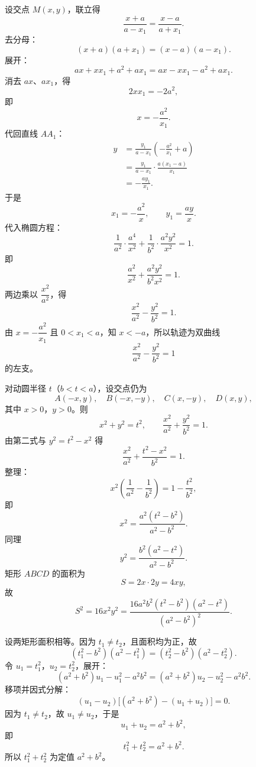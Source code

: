 \begin{answer}
设交点 $M(x,y)$，联立得
\nopagebreak[4]
\[\frac{x+a}{a-x_1}=\frac{x-a}{a+x_1}.\]
去分母：
\nopagebreak[4]
\[(x+a)(a+x_1)=(x-a)(a-x_1).\]
展开：
\nopagebreak[4]
\[ax+xx_1+a^2+ax_1=ax-xx_1-a^2+ax_1.\]
消去 $ax$、$ax_1$，得
\nopagebreak[4]
\[2xx_1=-2a^2,\]
即
\nopagebreak[4]
\[x=-\frac{a^2}{x_1}.\]
代回直线 $AA_1$：
\nopagebreak[4]
\[\begin{aligned}
y&=\frac{y_1}{a-x_1}\left(-\frac{a^2}{x_1}+a\right)\\
&=\frac{y_1}{a-x_1}\cdot\frac{a(x_1-a)}{x_1}\\
&=-\frac{ay_1}{x_1}.
\end{aligned}\]
于是
\nopagebreak[4]
\[x_1=-\frac{a^2}{x},\qquad y_1=\frac{ay}{x}.\]
代入椭圆方程：
\nopagebreak[4]
\[\frac{1}{a^2}\cdot\frac{a^4}{x^2}
+\frac{1}{b^2}\cdot\frac{a^2y^2}{x^2}=1.\]
即
\nopagebreak[4]
\[\frac{a^2}{x^2}+\frac{a^2y^2}{b^2x^2}=1.\]
两边乘以 $\dfrac{x^2}{a^2}$，得
\nopagebreak[4]
\[\frac{x^2}{a^2}-\frac{y^2}{b^2}=1.\]
由 $x=-\dfrac{a^2}{x_1}$ 且 $0<x_1<a$，知 $x<-a$，所以轨迹为双曲线
\nopagebreak[4]
\[\frac{x^2}{a^2}-\frac{y^2}{b^2}=1\]
的左支。


对动圆半径 $t$（$b<t<a$），设交点仍为
\nopagebreak[4]
\[A(-x,y),\quad B(-x,-y),\quad C(x,-y),\quad D(x,y),\]
其中 $x>0$，$y>0$。则
\nopagebreak[4]
\[x^2+y^2=t^2,\qquad \frac{x^2}{a^2}+\frac{y^2}{b^2}=1.\]
由第二式与 $y^2=t^2-x^2$ 得
\nopagebreak[4]
\[\frac{x^2}{a^2}+\frac{t^2-x^2}{b^2}=1.\]
整理：
\nopagebreak[4]
\[x^2\left(\frac1{a^2}-\frac1{b^2}\right)=1-\frac{t^2}{b^2},\]
即
\nopagebreak[4]
\[x^2=\frac{a^2(t^2-b^2)}{a^2-b^2}.\]
同理
\nopagebreak[4]
\[y^2=\frac{b^2(a^2-t^2)}{a^2-b^2}.\]
矩形 $ABCD$ 的面积为
\nopagebreak[4]
\[S=2x\cdot2y=4xy,\]
故
\nopagebreak[4]
\[S^2=16x^2y^2
=\frac{16a^2b^2(t^2-b^2)(a^2-t^2)}{(a^2-b^2)^2}.\]

设两矩形面积相等。因为 $t_1\neq t_2$，且面积均为正，故
\nopagebreak[4]
\[(t_1^2-b^2)(a^2-t_1^2)
=(t_2^2-b^2)(a^2-t_2^2).\]
令 $u_1=t_1^2$，$u_2=t_2^2$，展开：
\nopagebreak[4]
\[(a^2+b^2)u_1-u_1^2-a^2b^2
=(a^2+b^2)u_2-u_2^2-a^2b^2.\]
移项并因式分解：
\nopagebreak[4]
\[(u_1-u_2)\bigl[(a^2+b^2)-(u_1+u_2)\bigr]=0.\]
因为 $t_1\neq t_2$，故 $u_1\neq u_2$，于是
\nopagebreak[4]
\[u_1+u_2=a^2+b^2,\]
即
\nopagebreak[4]
\[t_1^2+t_2^2=a^2+b^2.\]
所以 $t_1^2+t_2^2$ 为定值 $a^2+b^2$。


\end{answer}
